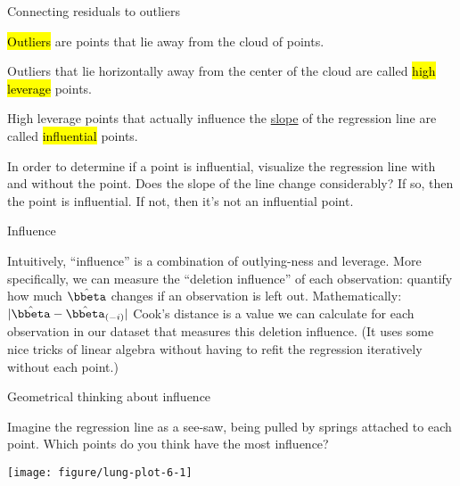 \documentclass[table]{beamer}\usepackage[]{graphicx}\usepackage[]{color}
\makeatletter
\def\maxwidth{ %
  \ifdim\Gin@nat@width>\linewidth
    \linewidth
  \else
    \Gin@nat@width
  \fi
}
\newenvironment{knitrout}{}{} %
\makeatother
\begin{document}

\begin{frame}{Connecting residuals to outliers}

\bi
\myitem \hl{Outliers} are points that lie away from the cloud  of points.

\myitem Outliers that lie horizontally away from the center of the cloud are called \hl{high leverage} points.

\myitem High leverage points that actually influence the \underline{slope} of the regression line are called \hl{influential} points.

\myitem In order to determine if a point is influential, visualize the regression line with and without the point. Does the slope of the line change considerably? If so, then the point is influential. If not, then it's not an influential point.

\ei
\end{frame}


\begin{frame}{Influence}

Intuitively, ``influence'' is a combination of outlying-ness and leverage. More specifically, we can measure the ``deletion influence'' of each observation: quantify how much $\hat\bbeta$ changes if an observation is left out.
\bi
	\myitem Mathematically: $|\hat{\bbeta}- \hat{\bbeta}_{(-i)}|$
	\myitem Cook's distance is a value we can calculate for each observation in our dataset that measures this deletion influence. (It uses some nice tricks of linear algebra without having to refit the regression iteratively without each point.)
\ei

\end{frame}


\begin{frame}[fragile]{Geometrical thinking about influence}

Imagine the regression line as a see-saw, being pulled by springs attached to each point. Which points do you think have the most influence?

\begin{knitrout}\footnotesize
{}\color{fgcolor}
\texttt{[image: figure/lung-plot-6-1]} 
\end{knitrout}

\end{frame}
\end{document}
